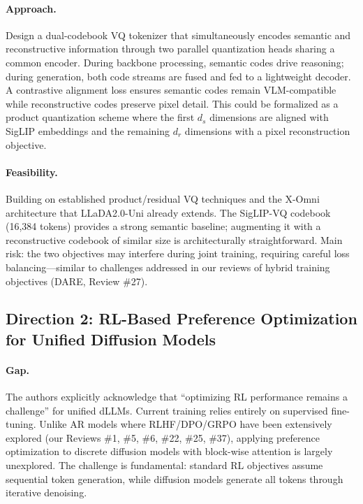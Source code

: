 \documentclass[11pt]{article}
\begin{document}
\paragraph{Approach.}
Design a dual-codebook VQ tokenizer that simultaneously encodes semantic and reconstructive information through two parallel quantization heads sharing a common encoder. During backbone processing, semantic codes drive reasoning; during generation, both code streams are fused and fed to a lightweight decoder. A contrastive alignment loss ensures semantic codes remain VLM-compatible while reconstructive codes preserve pixel detail. This could be formalized as a product quantization scheme where the first $d_s$ dimensions are aligned with SigLIP embeddings and the remaining $d_r$ dimensions with a pixel reconstruction objective.

\paragraph{Feasibility.}
Building on established product/residual VQ techniques and the X-Omni architecture that LLaDA2.0-Uni already extends. The SigLIP-VQ codebook (16,384 tokens) provides a strong semantic baseline; augmenting it with a reconstructive codebook of similar size is architecturally straightforward. Main risk: the two objectives may interfere during joint training, requiring careful loss balancing---similar to challenges addressed in our reviews of hybrid training objectives (DARE, Review \#27).

\subsection{Direction 2: RL-Based Preference Optimization for Unified Diffusion Models}

\paragraph{Gap.}
The authors explicitly acknowledge that ``optimizing RL performance remains a challenge'' for unified dLLMs. Current training relies entirely on supervised fine-tuning. Unlike AR models where RLHF/DPO/GRPO have been extensively explored (our Reviews \#1, \#5, \#6, \#22, \#25, \#37), applying preference optimization to discrete diffusion models with block-wise attention is largely unexplored. The challenge is fundamental: standard RL objectives assume sequential token generation, while diffusion models generate all tokens through iterative denoising.
\end{document}

